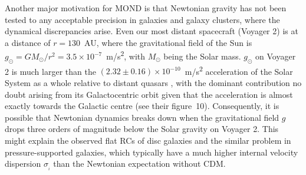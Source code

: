 \documentclass[fleqn,usenatbib,useAMS]{mnras} %
\begin{document}
Another major motivation for MOND is that Newtonian gravity has not been tested to any acceptable precision in galaxies and galaxy clusters, where the dynamical discrepancies arise. Even our most distant spacecraft (Voyager 2) is at a distance of $r = 130$~AU, where the gravitational field of the Sun is $g_\odot = GM_\odot/r^2 = 3.5 \times 10^{-7}$~m/s\textsuperscript{2}, with $M_\odot$ being the Solar mass. $g_\odot$ on Voyager 2 is much larger than the $\left( 2.32 \pm 0.16 \right) \times 10^{-10}$~m/s\textsuperscript{2} acceleration of the Solar System as a whole relative to distant quasars \citep{Klioner_2021}, with the dominant contribution no doubt arising from its Galactocentric orbit given that the acceleration is almost exactly towards the Galactic centre (see their figure~10). Consequently, it is possible that Newtonian dynamics breaks down when the gravitational field $g$ drops three orders of magnitude below the Solar gravity on Voyager 2. This might explain the observed flat RCs of disc galaxies and the similar problem in pressure-supported galaxies, which typically have a much higher internal velocity dispersion $\sigma_{_i}$ than the Newtonian expectation without CDM.
\end{document}

